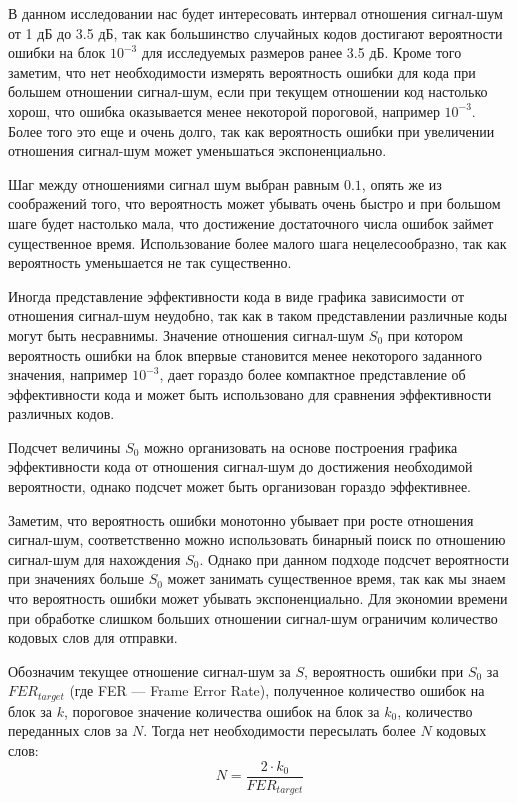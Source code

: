 В данном исследовании нас будет интересовать интервал 
отношения сигнал-шум от 1 дБ до 3.5 дБ, так как большинство
случайных кодов достигают вероятности ошибки на блок $10^{-3}$
для исследуемых размеров ранее 3.5 дБ. Кроме того заметим,
что нет необходимости измерять вероятность ошибки
для кода при большем отношении
сигнал-шум, если при текущем отношении код настолько хорош,
что ошибка оказывается менее некоторой пороговой, например
$10^{-3}$. Более того это еще и очень долго,
так как вероятность ошибки при увеличении отношения сигнал-шум
может уменьшаться экспоненциально.

Шаг между отношениями сигнал шум выбран равным $0.1$,
опять же из соображений того, что вероятность может убывать
очень быстро и при большом шаге будет настолько мала, что
достижение достаточного числа ошибок займет существенное время.
Использование более малого шага нецелесообразно, так как
вероятность уменьшается не так существенно.

Иногда представление эффективности кода в виде графика зависимости
от отношения сигнал-шум неудобно, так как в таком представлении различные
коды могут быть несравнимы. Значение отношения сигнал-шум $S_0$ при котором вероятность
ошибки на блок впервые становится менее некоторого заданного значения, например $10^{-3}$,
дает гораздо более компактное представление об эффективности кода и может быть использовано
для сравнения эффективности различных кодов.

Подсчет величины $S_0$ можно организовать на основе построения графика эффективности
кода от отношения сигнал-шум до достижения необходимой вероятности, однако подсчет
может быть организован гораздо эффективнее.

Заметим, что вероятность ошибки монотонно убывает при росте отношения сигнал-шум,
соответственно можно использовать бинарный поиск по отношению сигнал-шум для нахождения
$S_0$. Однако при данном подходе подсчет вероятности при значениях больше $S_0$ может
занимать существенное время, так как мы знаем что вероятность ошибки может убывать экспоненциально.
Для экономии времени при обработке слишком больших отношении сигнал-шум ограничим количество
кодовых слов для отправки. 

Обозначим текущее отношение сигнал-шум за $S$, вероятность ошибки
при $S_0$ за $FER_{target}$ (где FER --- Frame Error Rate), полученное количество ошибок на блок
за $k$, пороговое значение количества ошибок
на блок за $k_0$, количество переданных слов за $N$. Тогда нет необходимости пересылать
более $N$ кодовых слов:
\[
	N = \frac{2 \cdot k_0}{FER_{target}}
\]

